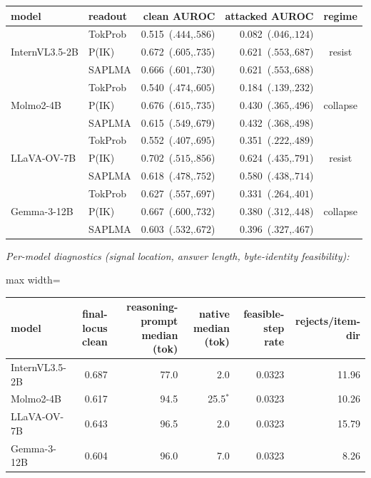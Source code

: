 \small
\setlength{\tabcolsep}{5pt}
\begin{tabular}{@{}llrrc@{}}
\toprule
model & readout & clean AUROC & attacked AUROC & regime \\
\midrule
\multirow{3}{*}{InternVL3.5-2B} & TokProb & 0.515~{\tiny($.444$,$.586$)} & 0.082~{\tiny($.046$,$.124$)} & \multirow{3}{*}{resist} \\
 & P(IK) & 0.672~{\tiny($.605$,$.735$)} & 0.621~{\tiny($.553$,$.687$)} &  \\
 & SAPLMA & 0.666~{\tiny($.601$,$.730$)} & 0.621~{\tiny($.553$,$.688$)} &  \\
\midrule
\multirow{3}{*}{Molmo2-4B} & TokProb & 0.540~{\tiny($.474$,$.605$)} & 0.184~{\tiny($.139$,$.232$)} & \multirow{3}{*}{collapse} \\
 & P(IK) & 0.676~{\tiny($.615$,$.735$)} & 0.430~{\tiny($.365$,$.496$)} &  \\
 & SAPLMA & 0.615~{\tiny($.549$,$.679$)} & 0.432~{\tiny($.368$,$.498$)} &  \\
\midrule
\multirow{3}{*}{LLaVA-OV-7B} & TokProb & 0.552~{\tiny($.407$,$.695$)} & 0.351~{\tiny($.222$,$.489$)} & \multirow{3}{*}{resist} \\
 & P(IK) & 0.702~{\tiny($.515$,$.856$)} & 0.624~{\tiny($.435$,$.791$)} &  \\
 & SAPLMA & 0.618~{\tiny($.478$,$.752$)} & 0.580~{\tiny($.438$,$.714$)} &  \\
\midrule
\multirow{3}{*}{Gemma-3-12B} & TokProb & 0.627~{\tiny($.557$,$.697$)} & 0.331~{\tiny($.264$,$.401$)} & \multirow{3}{*}{collapse} \\
 & P(IK) & 0.667~{\tiny($.600$,$.732$)} & 0.380~{\tiny($.312$,$.448$)} &  \\
 & SAPLMA & 0.603~{\tiny($.532$,$.672$)} & 0.396~{\tiny($.327$,$.467$)} &  \\
\bottomrule
\end{tabular}

\vspace{5pt}
{\footnotesize\itshape Per-model diagnostics (signal location, answer length, byte-identity feasibility):}\\[2pt]
\footnotesize
\setlength{\tabcolsep}{4.5pt}
\begin{adjustbox}{max width=\textwidth}
\begin{tabular}{@{}lrrrrr@{}}
\toprule
model & final-locus clean & reasoning-prompt median (tok) & native median (tok) & feasible-step rate & rejects/item-dir \\
\midrule
InternVL3.5-2B & 0.687 & 77.0 & 2.0 & 0.0323 & 11.96 \\
Molmo2-4B & 0.617 & 94.5 & 25.5$^{\ast}$ & 0.0323 & 10.26 \\
LLaVA-OV-7B & 0.643 & 96.5 & 2.0 & 0.0323 & 15.79 \\
Gemma-3-12B & 0.604 & 96.0 & 7.0 & 0.0323 & 8.26 \\
\bottomrule
\end{tabular}
\end{adjustbox}

